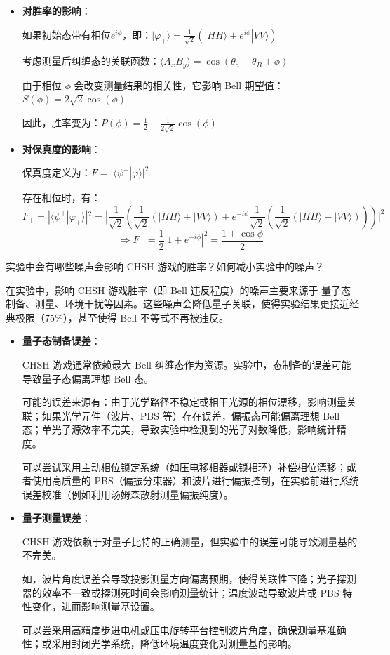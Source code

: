 \begin{itemize}
	\item \textbf{对胜率的影响}：
	
	如果初始态带有相位$e^{i\phi}$，即：$|\varphi_+ \rangle = \frac{1}{\sqrt{2}} (|HH \rangle + e^{i\phi} |VV \rangle)$
	
	考虑测量后纠缠态的关联函数：$\langle A_x B_y \rangle = \cos(\theta_a - \theta_B + \phi)$
	
	由于相位 $\phi$ 会改变测量结果的相关性，它影响 Bell 期望值：$S(\phi) = 2 \sqrt{2} \cos(\phi)$
	
	因此，胜率变为：$P(\phi) = \frac{1}{2} + \frac{1}{2\sqrt{2}}\cos(\phi)$
	
	\item \textbf{对保真度的影响}：
	
	保真度定义为：$F = |\langle \psi^+ | \varphi \rangle |^2$
	
	存在相位时，有：
	\[
	F_+ = |\langle \psi^+ | \varphi_+ \rangle |^2 = |\frac{1}{\sqrt{2}} (\frac{1}{\sqrt{2}}(|HH\rangle + |VV\rangle) + e^{-i\phi} \frac{1}{\sqrt{2}}(\frac{1}{\sqrt{2}}(|HH\rangle - |VV\rangle))) |^2
	\]
	\[
	\Rightarrow F_+ = \frac{1}{2} |1 + e^{-i\phi} |^2 = \frac{1 + \cos\phi}{2}
	\]
\end{itemize}

\begin{question}
	实验中会有哪些噪声会影响 CHSH 游戏的胜率？如何减小实验中的噪声？
\end{question}

在实验中，影响 CHSH 游戏胜率（即 Bell 违反程度）的噪声主要来源于 量子态制备、测量、环境干扰等因素。这些噪声会降低量子关联，使得实验结果更接近经典极限（75\%），甚至使得 Bell 不等式不再被违反。

\begin{itemize}
	\item \textbf{量子态制备误差}：
	
	CHSH 游戏通常依赖最大 Bell 纠缠态作为资源。实验中，态制备的误差可能导致量子态偏离理想 Bell 态。
	
	可能的误差来源有：由于光学路径不稳定或相干光源的相位漂移，影响测量关联；如果光学元件（波片、PBS 等）存在误差，偏振态可能偏离理想 Bell 态；单光子源效率不完美，导致实验中检测到的光子对数降低，影响统计精度。
	
	可以尝试采用主动相位锁定系统（如压电移相器或锁相环）补偿相位漂移；或者使用高质量的 PBS（偏振分束器）和波片进行偏振控制，在实验前进行系统误差校准（例如利用汤姆森散射测量偏振纯度）。
	
	\item \textbf{量子测量误差}：
	
	CHSH 游戏依赖于对量子比特的正确测量，但实验中的误差可能导致测量基的不完美。
	
	如，波片角度误差会导致投影测量方向偏离预期，使得关联性下降；光子探测器的效率不一致或探测死时间会影响测量统计；温度波动导致波片或 PBS 特性变化，进而影响测量基设置。
	
	可以尝采用高精度步进电机或压电旋转平台控制波片角度，确保测量基准确性；或采用封闭光学系统，降低环境温度变化对测量基的影响。
\end{itemize}